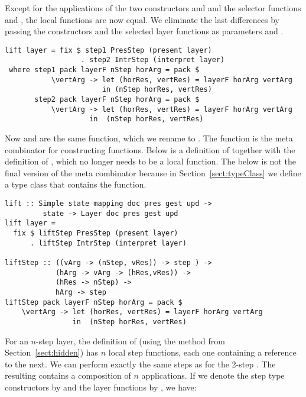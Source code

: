 Except for the applications of the two constructors  and  and the selector functions  and , the local functions are now equal. We eliminate the last differences by passing the constructors and the selected layer functions as parameters  and .

\begin{small} %
\begin{verbatim}
lift layer = fix $ step1 PresStep (present layer) 
                  . step2 IntrStep (interpret layer) 
 where step1 pack layerF nStep horArg = pack $ 
           \vertArg -> let (horRes, vertRes) = layerF horArg vertArg                                         
                       in (nStep horRes, vertRes)
       step2 pack layerF nStep horArg = pack $
           \vertArg -> let (horRes, vertRes) = layerF horArg vertArg                     
                    in  (nStep horRes, vertRes)
\end{verbatim}
\end{small}

Now  and  are the same function, which we rename to .  The function  is the meta combinator for constructing  functions. Below is a definition of  together with the definition of , which no longer needs to be a local function. The  below is not the final version of the meta combinator because in Section~\ref{sect:typeClass} we define a type class that contains the  function.


\begin{small} %
\begin{verbatim}
lift :: Simple state mapping doc pres gest upd ->
         state -> Layer doc pres gest upd
lift layer = 
  fix $ liftStep PresStep (present layer) 
      . liftStep IntrStep (interpret layer)

liftStep :: ((vArg -> (nStep, vRes)) -> step ) ->
            (hArg -> vArg -> (hRes,vRes)) ->
            (hRes -> nStep) ->
            hArg -> step
liftStep pack layerF nStep horArg = pack $
    \vertArg -> let (horRes, vertRes) = layerF horArg vertArg                     
                in  (nStep horRes, vertRes)
\end{verbatim}
\end{small}



For an $n$-step layer, the definition of  (using the method from Section~\ref{sect:hidden}) has $n$ local step functions, each one containing a reference to the next. \bc {} \ec We can perform exactly the same steps as for the 2-step . The resulting  contains a composition of $n$  applications. If we denote the step type constructors by  and the layer functions by , we have:

